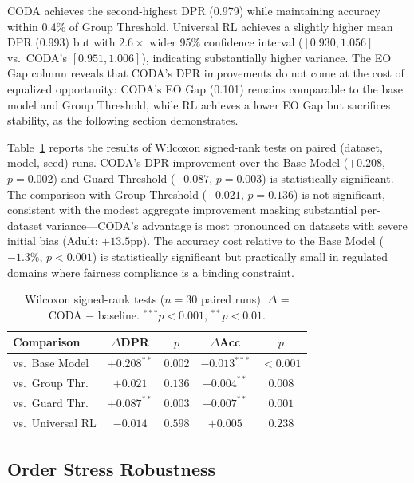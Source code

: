 \documentclass[letterpaper]{article} %
\theoremstyle{definition}
\begin{document}
CODA achieves the second-highest DPR (0.979) while maintaining accuracy within 0.4\% of Group Threshold. Universal RL achieves a slightly higher mean DPR (0.993) but with $2.6\times$ wider 95\% confidence interval ($[0.930, 1.056]$ vs.\ CODA's $[0.951, 1.006]$), indicating substantially higher variance. The EO Gap column reveals that CODA's DPR improvements do not come at the cost of equalized opportunity: CODA's EO Gap (0.101) remains comparable to the base model and Group Threshold, while RL achieves a lower EO Gap but sacrifices stability, as the following section demonstrates.

Table~\ref{tab:significance} reports the results of Wilcoxon signed-rank tests on paired (dataset, model, seed) runs. CODA's DPR improvement over the Base Model ($+0.208$, $p=0.002$) and Guard Threshold ($+0.087$, $p=0.003$) is statistically significant. The comparison with Group Threshold ($+0.021$, $p=0.136$) is not significant, consistent with the modest aggregate improvement masking substantial per-dataset variance---CODA's advantage is most pronounced on datasets with severe initial bias (Adult: $+13.5$pp). The accuracy cost relative to the Base Model ($-1.3\%$, $p<0.001$) is statistically significant but practically small in regulated domains where fairness compliance is a binding constraint.

\begin{table}[t]
\centering
\caption{Wilcoxon signed-rank tests ($n=30$ paired runs). $\Delta$ = CODA $-$ baseline. $^{***}p<0.001$, $^{**}p<0.01$.}
\label{tab:significance}
\small
\begin{tabular}{@{}lcccc@{}}
\toprule
Comparison & $\Delta$DPR & $p$ & $\Delta$Acc & $p$ \\
\midrule
vs.\ Base Model & $+0.208^{**}$ & $0.002$ & $-0.013^{***}$ & $<0.001$ \\
vs.\ Group Thr. & $+0.021$ & $0.136$ & $-0.004^{**}$ & $0.008$ \\
vs.\ Guard Thr. & $+0.087^{**}$ & $0.003$ & $-0.007^{**}$ & $0.001$ \\
vs.\ Universal RL & $-0.014$ & $0.598$ & $+0.005$ & $0.238$ \\
\bottomrule
\end{tabular}
\end{table}

\subsection{Order Stress Robustness}
\label{sec:orderstress}
\end{document}
